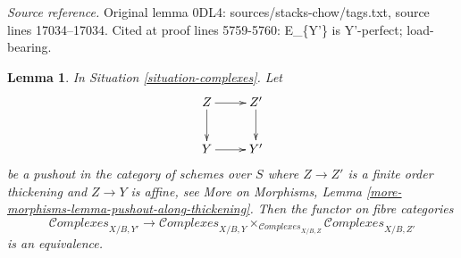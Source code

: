 \documentclass{stacks-project}
\theoremstyle{plain}
\newtheorem{lemma}[subsection]{Lemma}
\theoremstyle{definition}
\theoremstyle{remark}
\numberwithin{equation}{subsection}
\def\Complexesstack{\mathcal{C}\!\mathit{omplexes}}
\begin{document}
\noindent\textit{Source reference.} Original lemma 0DL4: sources/stacks-chow/tags.txt, source lines 17034--17034. Cited at proof lines 5759-5760: E\_\{Y'\} is Y'-perfect; load-bearing.\par\medskip
\begin{lemma}
\label{lemma-complexes-RS-star}
In Situation \ref{situation-complexes}. Let
$$
\xymatrix{
Z \ar[r] \ar[d] & Z' \ar[d] \\
Y \ar[r] & Y'
}
$$
be a pushout in the category of schemes over $S$ where
$Z \to Z'$ is a finite order thickening and $Z \to Y$ is affine, see
More on Morphisms, Lemma \ref{more-morphisms-lemma-pushout-along-thickening}.
Then the functor on fibre categories
$$
\Complexesstack_{X/B, Y'}
\longrightarrow
\Complexesstack_{X/B, Y}
\times_{\Complexesstack_{X/B, Z}}
\Complexesstack_{X/B, Z'}
$$
is an equivalence.
\end{lemma}
\end{document}
